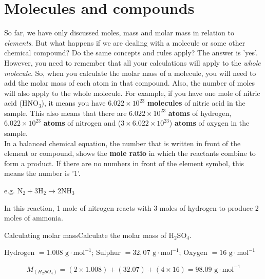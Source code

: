 



\section{Molecules and compounds}
\label{sec:quant:molecules}

So far, we have only discussed moles, mass and molar mass in relation to \textit{elements}. But what happens if we are dealing with a molecule or some other chemical compound? Do the same concepts and rules apply? The answer is 'yes'. However, you need to remember that all your calculations will apply to the \textit{whole molecule}. So, when you calculate the molar mass of a molecule, you will need to add the molar mass of each atom in that compound. Also, the number of moles will also apply to the whole molecule. For example, if you have one mole of nitric acid (HNO$_{3}$), it means you have $6.022 \times 10^{23}$ \textbf{molecules} of nitric acid in the sample. This also means that there are $6.022 \times 10^{23}$ \textbf{atoms} of hydrogen, $6.022 \times 10^{23}$ \textbf{atoms} of nitrogen and ($3 \times 6.022 \times 10^{23}$) \textbf{atoms} of oxygen in the sample. \\

In a balanced chemical equation, the number that is written in front of the element or compound, shows the \textbf{mole ratio} in which the reactants combine to form a product. If there are no numbers in front of the element symbol, this means the number is '1'.

\begin{center}
e.g. $\text{N}_{2} + 3\text{H}_{2} \rightarrow 2\text{NH}_{3}$
\end{center}

In this reaction, 1 mole of nitrogen reacts with 3 moles of hydrogen to produce 2 moles of ammonia.

\begin{wex}{Calculating molar mass}{Calculate the molar mass of H$_{2}$SO$_{4}$.\\}

{

Hydrogen $= 1.008 \text{ g} \cdot \text{mol}^{-1}$; Sulphur $= 32,07 \text{ g} \cdot \text{mol}^{-1}$; Oxygen $= 16 \text{ g} \cdot \text{mol}^{-1}$}

{

\begin{equation*}
M_{(H_{2}SO_{4})} = (2 \times 1.008) + (32.07) + (4 \times 16) = 98.09 \text{ g} \cdot \text{mol}^{-1}
\end{equation*}
}

\end{wex}

